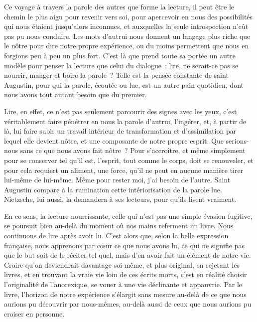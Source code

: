 
{Ce voyage à travers la parole des autres que forme la lecture, il peut être le chemin le plus aigu pour revenir vers soi, pour apercevoir en nous des possibilités qui nous étaient jusqu'alors inconnues, et auxquelles la seule introspection n'eût pas pu nous conduire. Les mots d'autrui nous donnent un langage plus riche que le nôtre pour dire notre propre expérience, ou du moins permettent que nous en forgions peu à peu un plus fort. C'est là que prend toute sa portée un autre modèle pour penser la lecture que celui du dialogue~: lire, ne serait-ce pas se nourrir, manger et boire la parole~? Telle est la pensée constante de saint Augustin, pour qui la parole, écoutée ou lue, est un autre pain quotidien, dont nous avons tout autant besoin que du premier.

Lire, en effet, ce n'est pas seulement parcourir des signes avec les yeux, c'est véritablement faire pénétrer en nous la parole d'autrui, l'ingérer, et, à partir de là, lui faire subir un travail intérieur de transformation et d'assimilation par lequel elle devient nôtre, et une composante de notre propre esprit. Que serions-nous sans ce que nous avons fait nôtre~? Pour s'accroître, et même simplement pour se conserver tel qu'il est, l'esprit, tout comme le corps, doit se renouveler, et pour cela requiert un aliment, une force, qu'il ne peut en aucune manière tirer lui-même de lui-même. Même pour rester moi, j'ai besoin de l'autre. Saint Augustin compare à la rumination cette intériorisation de la parole lue. Nietzsche, lui aussi, la demandera à ses lecteurs, pour qu'ils lisent vraiment.

En ce sens, la lecture nourrissante, celle qui n'est pas une simple évasion fugitive, se poursuit bien au-delà du moment où nos mains referment un livre. Nous continuons de lire après avoir lu. C'est alors que, selon la belle expression française, nous apprenons par cœur ce que nous avons lu, ce qui ne signifie pas que le but soit de le réciter tel quel, mais d'en avoir fait un élément de notre vie. Croire qu'on deviendrait davantage soi-même, et plus original, en rejetant les livres, et en trouvant la vraie vie loin de ces écrits morts, c'est en réalité choisir l'originalité de l'anorexique, se vouer à une vie déclinante et appauvrie. Par le livre, l'horizon de notre expérience s'élargit sans mesure au-delà de ce que nous aurions pu découvrir par nous-mêmes, au-delà aussi de ceux que nous aurions pu croiser en personne.
}

